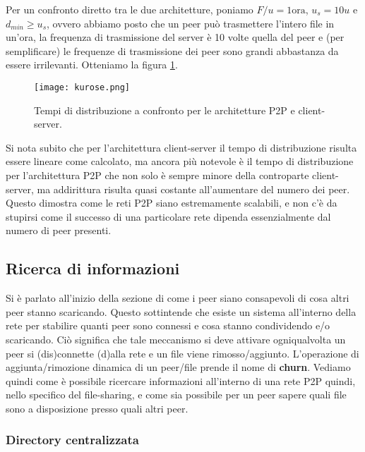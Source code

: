 Per un confronto diretto tra le due architetture, poniamo $F/u = 1 \text{ora}$, $u_s = 10u$ e $d_{min} \geq u_s$, ovvero abbiamo posto che un peer può trasmettere l'intero file in un'ora, la frequenza di trasmissione del server è 10 volte quella del peer e (per semplificare) le frequenze di trasmissione dei peer sono grandi abbastanza da essere irrilevanti. Otteniamo la figura \ref{img_kurose}.

\begin{figure}[htbp]
\centering
\texttt{[image: kurose.png]}
\caption[Tempi di distribuzione]{Tempi di distribuzione a confronto per le architetture P2P e client-server.\label{img_kurose}}
\end{figure}

Si nota subito che per l'architettura client-server il tempo di distribuzione risulta essere lineare come calcolato, ma ancora più notevole è il tempo di distribuzione per l'architettura P2P che non solo è sempre minore della controparte client-server, ma addirittura risulta quasi costante all'aumentare del numero dei peer. Questo dimostra come le reti P2P siano estremamente scalabili, e non c'è da stupirsi come il successo di una particolare rete dipenda essenzialmente dal numero di peer presenti. %

\subsection{Ricerca di informazioni}\label{ricerca-di-informazioni}

Si è parlato all'inizio della sezione di come i peer siano consapevoli di cosa altri peer stanno scaricando. Questo sottintende che esiste un sistema all'interno della rete per stabilire quanti peer sono connessi e cosa stanno condividendo e/o scaricando. Ciò significa che tale meccanismo si deve attivare ogniqualvolta un peer si (dis)connette (d)alla rete e un file viene rimosso/aggiunto. L'operazione di aggiunta/rimozione dinamica di un peer/file prende il nome di \textbf{\gls{churn}}. Vediamo quindi come è possibile ricercare informazioni all'interno di una rete P2P quindi, nello specifico del file-sharing, e come sia possibile per un peer sapere quali file sono a disposizione presso quali altri peer.

\subsubsection{Directory centralizzata}\label{directory-centralizzata}

